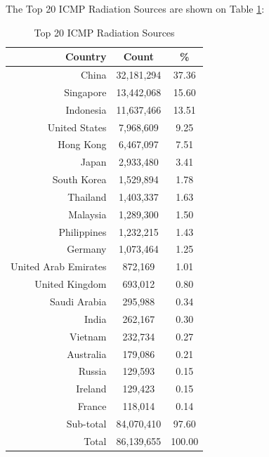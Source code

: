 \newpage
The Top 20 ICMP Radiation Sources are shown on Table \ref{tab:top20icmpradiationsources}:
\begin{table}[!h]
\begin{center}
\caption{Top 20 ICMP Radiation Sources}
\label{tab:top20icmpradiationsources}
\begin{tabular}{ |r|c|c| }
\hline
\centering Country & Count & \%  \\
\hline
China & 32,181,294 & 37.36  \\
Singapore & 13,442,068 & 15.60  \\
Indonesia & 11,637,466 & 13.51  \\
United States & 7,968,609 & 9.25  \\
Hong Kong & 6,467,097 & 7.51  \\
Japan & 2,933,480 & 3.41  \\
South Korea & 1,529,894 & 1.78  \\
Thailand & 1,403,337 & 1.63  \\
Malaysia & 1,289,300 & 1.50  \\
Philippines & 1,232,215 & 1.43  \\
Germany & 1,073,464 & 1.25  \\
United Arab Emirates & 872,169 & 1.01  \\
United Kingdom & 693,012 & 0.80  \\
Saudi Arabia & 295,988 & 0.34  \\
India & 262,167 & 0.30  \\
Vietnam & 232,734 & 0.27  \\
Australia & 179,086 & 0.21  \\
Russia & 129,593 & 0.15  \\
Ireland & 129,423 & 0.15  \\
France & 118,014 & 0.14  \\
\hline
Sub-total & 84,070,410 & 97.60  \\
\hline
Total & 86,139,655 & 100.00  \\
\hline
\end{tabular}
\end{center}
\end{table}

